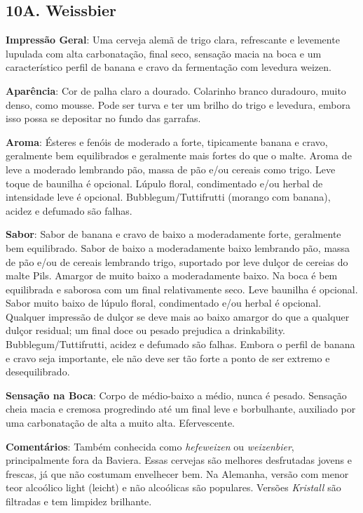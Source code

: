 \subsection*{10A. Weissbier}

\textbf{Impressão Geral}: Uma cerveja alemã de trigo clara, refrescante e levemente lupulada com alta carbonatação, final seco, sensação macia na boca e um característico perfil de banana e cravo da fermentação com levedura weizen.

\textbf{Aparência}: Cor de palha claro a dourado. Colarinho branco duradouro, muito denso, como mousse. Pode ser turva e ter um brilho do trigo e levedura, embora isso possa se depositar no fundo das garrafas.

\textbf{Aroma}: Ésteres e fenóis de moderado a forte, tipicamente banana e cravo, geralmente bem equilibrados e geralmente mais fortes do que o malte. Aroma de leve a moderado lembrando pão, massa de pão e/ou cereais como trigo. Leve toque de baunilha é opcional. Lúpulo floral, condimentado e/ou herbal de intensidade leve é opcional. Bubblegum/Tuttifrutti (morango com banana), acidez e defumado são falhas.

\textbf{Sabor}: Sabor de banana e cravo de baixo a moderadamente forte, geralmente bem equilibrado. Sabor de baixo a moderadamente baixo lembrando pão, massa de pão e/ou de cereais lembrando trigo, suportado por leve dulçor de cereias do malte Pils. Amargor de muito baixo a moderadamente baixo. Na boca é bem equilibrada e saborosa com um final relativamente seco. Leve baunilha é opcional. Sabor muito baixo de lúpulo floral, condimentado e/ou herbal é opcional. Qualquer impressão de dulçor se deve mais ao baixo amargor do que a qualquer dulçor residual; um final doce ou pesado prejudica a drinkability. Bubblegum/Tuttifrutti, acidez e defumado são falhas. Embora o perfil de banana e cravo seja importante, ele não deve ser tão forte a ponto de ser extremo e desequilibrado.

\textbf{Sensação na Boca}: Corpo de médio-baixo a médio, nunca é pesado. Sensação cheia macia e cremosa progredindo até um final leve e borbulhante, auxiliado por uma carbonatação de alta a muito alta. Efervescente.

\textbf{Comentários}: Também conhecida como \textit{hefeweizen} ou \textit{weizenbier}, principalmente fora da Baviera. Essas cervejas são melhores desfrutadas jovens e frescas, já que não costumam envelhecer bem. Na Alemanha, versão com menor teor alcoólico light (leicht) e não alcoólicas são populares. Versões \textit{Kristall} são filtradas e tem limpidez brilhante.

